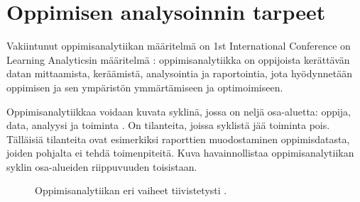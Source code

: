 \chapter{Oppimisen analysoinnin tarpeet\label{luku2}}

Vakiintunut oppimisanalytiikan määritelmä on 1st International Conference on Learning Analyticsin määritelmä \citep{siemensLearningAnalyticsEmergence2013,clowLearningAnalyticsCycle2012}: oppimisanalytiikka on oppijoista kerättävän datan mittaamista, keräämistä, analysointia ja raportointia, jota hyödynnetään oppimisen ja sen ympäristön ymmärtämiseen ja optimoimiseen.

Oppimisanalytiikkaa voidaan kuvata syklinä, jossa on neljä osa-aluetta: oppija, data, analyysi ja toiminta \citep{clowLearningAnalyticsCycle2012}. On tilanteita, joissa syklistä jää toiminta pois. Tälläisiä tilanteita ovat esimerkiksi raporttien muodostaminen oppimisdatasta, joiden pohjalta ei tehdä toimenpiteitä. Kuva havainnollistaa oppimisanalytiikan syklin osa-alueiden riippuvuuden toisistaan.

\begin{figure}[h]
    \centering
    \caption{Oppimisanalytiikan eri vaiheet tiivistetysti \citep{clowLearningAnalyticsCycle2012}.}
\end{figure}


